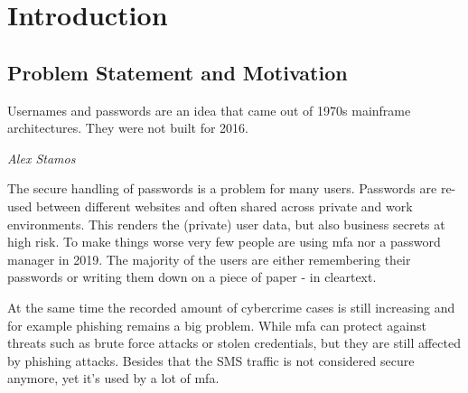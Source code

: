 \chapter{Introduction}
\label{chapter:introduction}

\section{Problem Statement and Motivation}

\setlength{}
\epigraph{\frqq Usernames and passwords are an idea that came out of 1970s mainframe architectures. They were not built for 2016.\flqq\footnotemark}{\textit{Alex Stamos}}

The secure handling of passwords is a problem for many users.
Passwords are re-used between different websites and often shared across private and work environments. This renders the (private) user data, but also business secrets at high risk.
To make things worse very few people are using \gls{mfa} nor a password manager in 2019. The majority of the users are either remembering their passwords or writing them down on a piece of paper - in cleartext.

At the same time the recorded amount of cybercrime cases is still increasing and for example phishing remains a big problem. While \gls{mfa} can protect against threats such as brute force attacks or stolen credentials, but they are still affected by phishing attacks. Besides that the SMS traffic is not considered secure anymore, yet it's used by a lot of \gls{mfa}.

